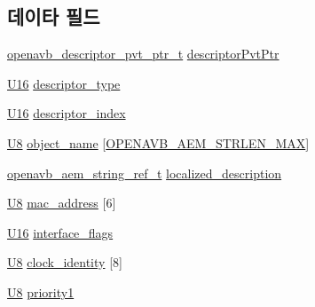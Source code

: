 \subsection*{데이타 필드}
\begin{DoxyCompactItemize}
\item 
\hyperlink{openavb__aem__pub_8h_a85eabab4b7d2466e94c1c3b43b11371d}{openavb\+\_\+descriptor\+\_\+pvt\+\_\+ptr\+\_\+t} \hyperlink{structopenavb__aem__descriptor__avb__interface__t_a302e92fd6cf4d398d5305395359fb157}{descriptor\+Pvt\+Ptr}
\item 
\hyperlink{openavb__types__base__pub_8h_a0a0a322d5fa4a546d293a77ba8b4a71f}{U16} \hyperlink{structopenavb__aem__descriptor__avb__interface__t_a1e231d7874aada5925b29affc76782cc}{descriptor\+\_\+type}
\item 
\hyperlink{openavb__types__base__pub_8h_a0a0a322d5fa4a546d293a77ba8b4a71f}{U16} \hyperlink{structopenavb__aem__descriptor__avb__interface__t_ab26fb363c24b9a2a4391f9171c981b08}{descriptor\+\_\+index}
\item 
\hyperlink{openavb__types__base__pub_8h_aa63ef7b996d5487ce35a5a66601f3e73}{U8} \hyperlink{structopenavb__aem__descriptor__avb__interface__t_a5e98aba8105a7a6d82fac41816c83da3}{object\+\_\+name} \mbox{[}\hyperlink{openavb__aem__types__pub_8h_ab2bb82e9f856a76b8305e4864f23ee58}{O\+P\+E\+N\+A\+V\+B\+\_\+\+A\+E\+M\+\_\+\+S\+T\+R\+L\+E\+N\+\_\+\+M\+AX}\mbox{]}
\item 
\hyperlink{structopenavb__aem__string__ref__t}{openavb\+\_\+aem\+\_\+string\+\_\+ref\+\_\+t} \hyperlink{structopenavb__aem__descriptor__avb__interface__t_afd613361c59409fb6dcc0c237d1cfbfd}{localized\+\_\+description}
\item 
\hyperlink{openavb__types__base__pub_8h_aa63ef7b996d5487ce35a5a66601f3e73}{U8} \hyperlink{structopenavb__aem__descriptor__avb__interface__t_ae89cba1786fd99df25dbf48f24ccb50f}{mac\+\_\+address} \mbox{[}6\mbox{]}
\item 
\hyperlink{openavb__types__base__pub_8h_a0a0a322d5fa4a546d293a77ba8b4a71f}{U16} \hyperlink{structopenavb__aem__descriptor__avb__interface__t_ac3a77d7e353ce5fe5d160862dc17b814}{interface\+\_\+flags}
\item 
\hyperlink{openavb__types__base__pub_8h_aa63ef7b996d5487ce35a5a66601f3e73}{U8} \hyperlink{structopenavb__aem__descriptor__avb__interface__t_a7136eb0ab8001ef2e0642b79fbf42f93}{clock\+\_\+identity} \mbox{[}8\mbox{]}
\item 
\hyperlink{openavb__types__base__pub_8h_aa63ef7b996d5487ce35a5a66601f3e73}{U8} \hyperlink{structopenavb__aem__descriptor__avb__interface__t_a414abecc05c181f8d85ea0b3dd63d135}{priority1}

\end{DoxyCompactItemize}
